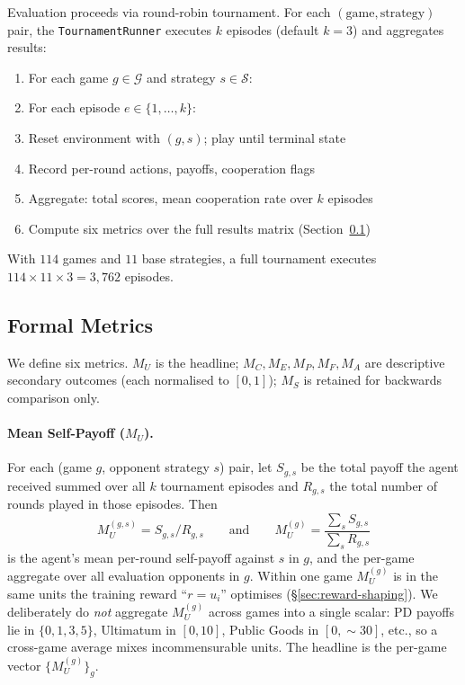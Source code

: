 Evaluation proceeds via round-robin tournament. For each
$(\text{game}, \text{strategy})$ pair, the \texttt{TournamentRunner}
executes $k$ episodes (default $k=3$) and aggregates results:

\begin{enumerate}[nosep]
    \item For each game $g \in \mathcal{G}$ and strategy $s \in \mathcal{S}$:
    \item \quad For each episode $e \in \{1, \ldots, k\}$:
    \item \quad\quad Reset environment with $(g, s)$; play until terminal state
    \item \quad\quad Record per-round actions, payoffs, cooperation flags
    \item \quad Aggregate: total scores, mean cooperation rate over $k$ episodes
    \item Compute six metrics over the full results matrix (Section~\ref{sec:formal-metrics})
\end{enumerate}

\noindent With $114$ games and $11$ base strategies, a full tournament
executes $114 \times 11 \times 3 = 3{,}762$ episodes.

\subsection{Formal Metrics}
\label{sec:formal-metrics}

We define six metrics. $M_U$ is the headline; $M_C, M_E, M_P, M_F, M_A$
are descriptive secondary outcomes (each normalised to $[0, 1]$);
$M_S$ is retained for backwards comparison only.

\paragraph{Mean Self-Payoff ($M_U$).}
For each (game $g$, opponent strategy $s$) pair, let $S_{g,s}$ be the
total payoff the agent received summed over all $k$ tournament episodes
and $R_{g,s}$ the total number of rounds played in those episodes. Then
\[
M_U^{(g,s)} = S_{g,s} / R_{g,s}
\qquad\text{and}\qquad
M_U^{(g)} = \frac{\sum_s S_{g,s}}{\sum_s R_{g,s}}
\]
is the agent's mean per-round self-payoff against $s$ in $g$, and the
per-game aggregate over all evaluation opponents in $g$. Within one
game $M_U^{(g)}$ is in the same units the training reward
``$r = u_i$'' optimises (\S\ref{sec:reward-shaping}). We deliberately do
\emph{not} aggregate $M_U^{(g)}$ across games into a single scalar:
PD payoffs lie in $\{0,1,3,5\}$, Ultimatum in $[0,10]$, Public Goods
in $[0,\sim 30]$, etc., so a cross-game average mixes incommensurable
units. The headline is the per-game vector $\{M_U^{(g)}\}_g$.

